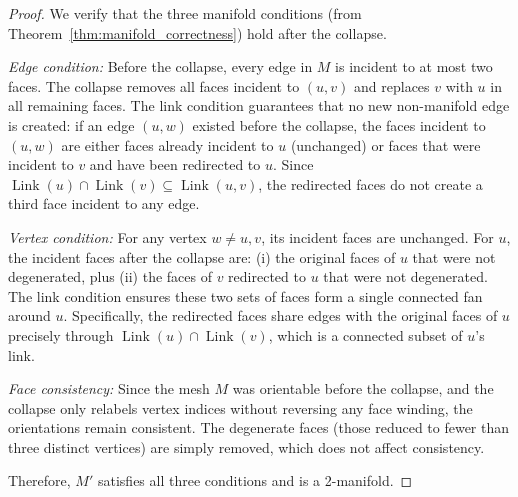 \begin{proof}
We verify that the three manifold conditions (from Theorem~\ref{thm:manifold_correctness}) hold after the collapse.

\emph{Edge condition:} Before the collapse, every edge in $M$ is incident to at most two faces. The collapse removes all faces incident to $(u, v)$ and replaces $v$ with $u$ in all remaining faces. The link condition guarantees that no new non-manifold edge is created: if an edge $(u, w)$ existed before the collapse, the faces incident to $(u, w)$ are either faces already incident to $u$ (unchanged) or faces that were incident to $v$ and have been redirected to $u$. Since $\operatorname{Link}(u) \cap \operatorname{Link}(v) \subseteq \operatorname{Link}(u, v)$, the redirected faces do not create a third face incident to any edge.

\emph{Vertex condition:} For any vertex $w \neq u, v$, its incident faces are unchanged. For $u$, the incident faces after the collapse are: (i) the original faces of $u$ that were not degenerated, plus (ii) the faces of $v$ redirected to $u$ that were not degenerated. The link condition ensures these two sets of faces form a single connected fan around $u$. Specifically, the redirected faces share edges with the original faces of $u$ precisely through $\operatorname{Link}(u) \cap \operatorname{Link}(v)$, which is a connected subset of $u$'s link.

\emph{Face consistency:} Since the mesh $M$ was orientable before the collapse, and the collapse only relabels vertex indices without reversing any face winding, the orientations remain consistent. The degenerate faces (those reduced to fewer than three distinct vertices) are simply removed, which does not affect consistency.

Therefore, $M'$ satisfies all three conditions and is a 2-manifold.
\end{proof}

